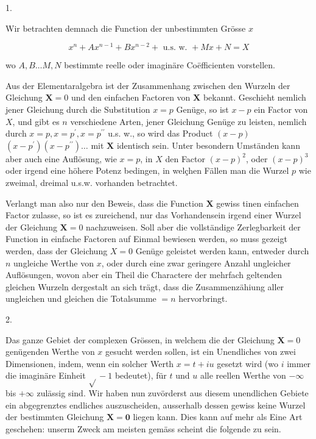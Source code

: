 \documentclass[twoside,12pt, showframe]{memoir}
\begin{document}
1.

Wir betrachten demnach die Function der unbestimmten Grösse \(x\)

\[
x^{n}+A x^{n-1}+B x^{n-2}+\text { u.s. w. }+M x+N=X
\]

wo \(A, B \ldots M, N\) bestimmte reelle oder imaginäre Coëfficienten vorstellen.

Aus der Elementaralgebra ist der Zusammenhang zwischen den Wurzeln der Gleichung \(\boldsymbol{X}=0\) und den einfachen Factoren von \(\boldsymbol{X}\) bekannt. Geschieht nemlich jener Gleichung durch die Substitution \(x=p\) Genüge, so ist \(x-p\) ein Factor von \(X\), und gibt es \(n\) verschiedene Arten, jener Gleichung Genüge zu leisten, nemlich durch \(x=p, x=p^{\prime}, x=p^{\prime \prime}\) u.s. w., so wird das Product \((x-p)\) \(\left(x-p^{\prime}\right)\left(x-p^{\prime \prime}\right) \ldots\) mit \(\boldsymbol{X}\) identisch sein. Unter besondern Umständen kann aber auch eine Auflösung, wie \(x=p\), in \(X\) den Factor \((x-p)^{2}\), oder \((x-p)^{3}\) oder irgend eine höhere Potenz bedingen, in welçhen Fällen man die Wurzel \(p\) wie zweimal, dreimal u.s.w. vorhanden betrachtet.

Verlangt man also nur den Beweis, dass die Function \(\boldsymbol{X}\) gewiss tinen einfachen Factor zulasse, so ist es zureichend, nur das Vorhandensein irgend einer Wurzel der Gleichung \(\boldsymbol{X}=0\) nachzuweisen. Soll aber die vollständige Zerlegbarkeit der Function in einfache Factoren auf Einmal bewiesen werden, so muss gezeigt werden, dass der Gleichung \(X=0\) Genüge geleistet werden kann, entweder durch \(n\) ungleiche Werthe von \(x\), oder durch eine zwar geringere Anzahl ungleicher Auflösungen, wovon aber ein Theil die Charactere der mehrfach geltenden gleichen Wurzeln dergestalt an sich trägt, dass die Zusammenzähiung aller ungleichen und gleichen die Totalsumme \(=n\) hervorbringt.

2.

Das ganze Gebiet der complexen Grössen, in welchem die der Gleichung \(\boldsymbol{X}=0\) genügenden Werthe von \(x\) gesucht werden sollen, ist ein Unendliches von zwei Dimensionen, indem, wenn ein solcher Werth \(x=t+i u\) gesetzt wird (wo \(i\) immer die imaginäre Einheit \(\sqrt{ }-1\) bedeutet), für \(t\) und \(u\) alle reellen Werthe von \(-\infty\) bis \(+\infty\) zulässig sind. Wir haben nun zuvörderst aus diesem unendlichen Gebiete ein abgegrenztes endliches auszuscheiden, ausserhalb dessen gewiss keine Wurzel der bestimmten Gleichung \(\mathbf{X}=\mathbf{0}\) liegen kann. Dies kann auf mehr als Eine Art geschehen: unserm Zweck am meisten gemäss scheint die folgende zu sein.
\end{document}
